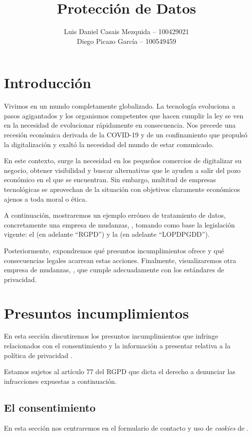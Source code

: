\documentclass[es]{uc3mreport}
\author{
    Luis Daniel Casais Mezquida -- 100429021\\
    Diego Picazo García -- 100549459
}
\title{Protección de Datos}
\begin{document}


    \begin{report}
        \section{Introducción}
        Vivimos en un mundo completamente globalizado. La tecnología evoluciona a pasos agigantados y los organismos competentes que hacen cumplir la ley se ven en la necesidad de evolucionar rápidamente en consecuencia. Nos precede una recesión económica derivada de la COVID-19 y de un confinamiento que propulsó la digitalización y exaltó la necesidad del mundo de estar comunicado.

        En este contexto, surge la necesidad en los pequeños comercios de digitalizar su negocio, obtener visibilidad y buscar alternativas que le ayuden a salir del pozo económico en el que se encuentran. Sin embargo, multitud de empresas tecnológicas se aprovechan de la situación con objetivos claramente económicos ajenos a toda moral o ética.

        A continuación, mostraremos un ejemplo erróneo de tratamiento de datos, concretamente una empresa de mudanzas, \cite{benji}, tomando como base la legislación vigente: el \cite{RGPD} (en adelante ``RGPD'') y la \cite{LOPDPGDD} (en adelante ``LOPDPGDD''). 
        
        Posteriormente, expondremos qué presuntos incumplimientos ofrece y qué consecuencias legales acarrean estas acciones. Finalmente, visualizaremos otra empresa de mudanzas, \cite{alcorcon}, que cumple adecuadamente con los estándares de privacidad.

        \section{Presuntos incumplimientos}
        En esta sección discutiremos los presuntos incumplimientos que \cite{benji} infringe relacionados con el consentimiento y la información a presentar relativa a la política de privacidad .

        Estamos sujetos al artículo 77 del RGPD que dicta el derecho a denunciar las infracciones expuestas a continuación.

        \subsection{El consentimiento}
        En esta sección nos centraremos en el formulario de contacto y uso de \textit{cookies} de \cite{benji}.


\end{report}
\end{document}
